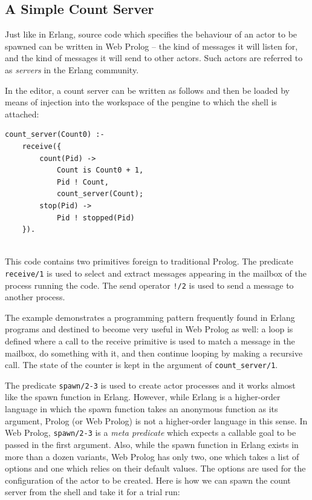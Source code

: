 \documentclass{tlp}
\begin{document}
\subsection{A Simple Count Server}\label{sec:count-server}

\noindent Just like in Erlang, source code which specifies the behaviour of an actor to be spawned can be written in Web Prolog -- the kind of messages it will listen for, and the kind of messages it will send to other actors. Such actors are referred to as \textit{servers} in the Erlang community.

In the editor, a count server can be written as follows and then be loaded by means of injection into the workspace of the pengine to which the shell is attached: 

\begin{lstlisting}
count_server(Count0) :-                 
    receive({             
        count(Pid) ->
            Count is Count0 + 1,    
            Pid ! Count,   
            count_server(Count);
        stop(Pid) ->
            Pid ! stopped(Pid)     
    }).                   
	                      
\end{lstlisting}

\noindent This code contains two primitives foreign to traditional Prolog. The predicate \texttt{receive/1} is used to select and extract messages appearing in the mailbox of the process running the code. The send operator \texttt{!/2} is used to send a message to another process.

The example demonstrates a programming pattern frequently found in Erlang programs and destined to become very useful in Web Prolog as well: a loop is defined where a call to the receive primitive is used to match a message in the mailbox, do something with it, and then continue looping by making a recursive call. The state of the counter is kept in the argument of \texttt{count\_server/1}.

The predicate \texttt{spawn/2-3} is used to create actor processes and it works almost like the spawn function in Erlang. However, while Erlang is a higher-order language in which the spawn function takes an anonymous function as its argument, Prolog (or Web Prolog) is not a higher-order language in this sense. In Web Prolog, \texttt{spawn/2-3} is a \textit{meta predicate} which expects a callable goal to be passed in the first argument. Also, while the spawn function in Erlang exists in more than a dozen variants, Web Prolog has only two, one which takes a list of options and one which relies on their default values. The options are used for the configuration of the actor to be created. Here is how we can spawn the count server from the shell and take it for a trial run:
\end{document}
